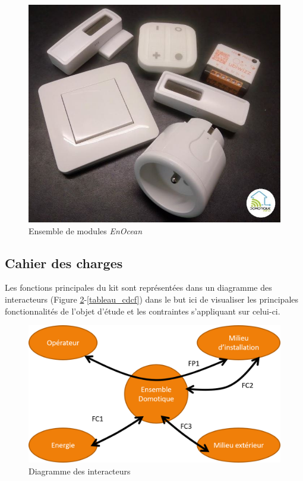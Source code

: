 \documentclass{rapportENS}
\begin{document}
 \begin{figure}[h!]
     \centering
     \includegraphics[scale=0.5]{kit_enocean.jpg}
     \vspace{0.5cm}
     \caption{Ensemble de modules \textit{EnOcean}}
     \label{fig:kit_enOcean}
 \end{figure}
 
 \subsection{Cahier des charges}
 Les fonctions principales du kit sont représentées dans un diagramme des interacteurs (Figure \ref{fig:Inter-acteurs}-\ref{tableau_cdcf}) dans le but ici de visualiser les principales fonctionnalités de l'objet d'étude et les contraintes s'appliquant sur celui-ci.
 
 \vspace{0.7cm}
 
 \begin{figure}[h!]
     \centering
     \includegraphics[width=0.9\linewidth]{Graphe_cdcdf.png}
     \vspace{0.7cm}
     \caption{Diagramme des interacteurs}
     \label{fig:Inter-acteurs}
 \end{figure}
 
\end{document}
